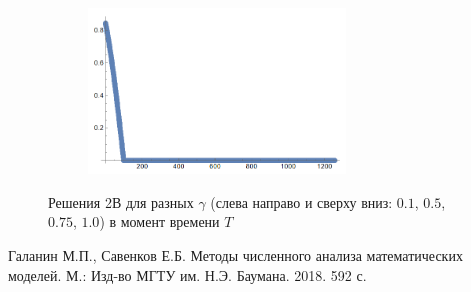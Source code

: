 \documentclass[12pt, a4paper]{article}
\begin{document}
\begin{figure}[H]
\begin{subfigure}{.5\textwidth}
			\centering
			\includegraphics[width=0.75\textwidth]{test3-1}
		\end{subfigure}
		\caption{Решения 2В для разных $\gamma$ (слева направо и сверху вниз: $0.1$, $0.5$, $0.75$, $1.0$) в момент времени $T$}
	\end{figure}

	\clearpage
	\begin{thebibliography}{1}
		 Галанин М.П., Савенков Е.Б. Методы численного анализа математических моделей. М.: Изд-во МГТУ им. Н.Э. Баумана. 2018. 592 с.
		
	\end{thebibliography}
	
\end{document}

